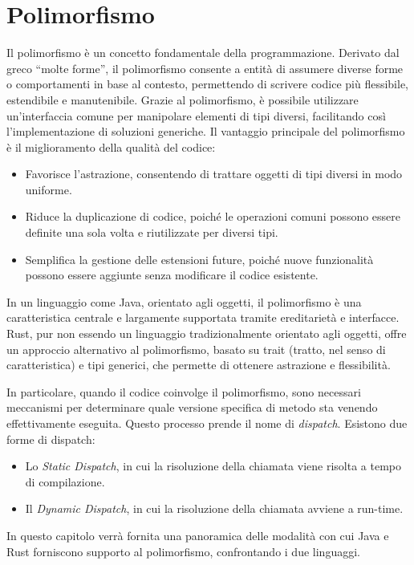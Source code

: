 
\chapter{Polimorfismo}
Il polimorfismo è un concetto fondamentale della programmazione. Derivato dal greco “molte forme”, il polimorfismo consente a entità di assumere diverse forme o comportamenti in base al contesto, permettendo di scrivere codice più flessibile, estendibile e manutenibile. Grazie al polimorfismo, è possibile utilizzare un'interfaccia comune per manipolare elementi di tipi diversi, facilitando così l'implementazione di soluzioni generiche. Il vantaggio principale del polimorfismo è il miglioramento della qualità del codice:
\begin{itemize}
    \item Favorisce l'astrazione, consentendo di trattare oggetti di tipi diversi in modo uniforme.
    \item Riduce la duplicazione di codice, poiché le operazioni comuni possono essere definite una sola volta e riutilizzate per diversi tipi.
    \item Semplifica la gestione delle estensioni future, poiché nuove funzionalità possono essere aggiunte senza modificare il codice esistente.
\end{itemize}
In un linguaggio come Java, orientato agli oggetti, il polimorfismo è una caratteristica centrale e largamente supportata tramite ereditarietà e interfacce. Rust, pur non essendo un linguaggio tradizionalmente orientato agli oggetti, offre un approccio alternativo al polimorfismo, basato su trait (tratto, nel senso di caratteristica) e tipi generici, che permette di ottenere astrazione e flessibilità.

In particolare, quando il codice coinvolge il polimorfismo, sono necessari meccanismi per determinare quale versione specifica di metodo sta venendo effettivamente eseguita. Questo processo prende il nome di \textit{dispatch}. Esistono due forme di dispatch: 
\begin{itemize}
    \item Lo \textit{Static Dispatch}, in cui la risoluzione della chiamata viene risolta a tempo di compilazione.
    \item Il \textit{Dynamic Dispatch}, in cui la risoluzione della chiamata avviene a run-time. 
\end{itemize}
In questo capitolo verrà fornita una panoramica delle modalità con cui Java e Rust forniscono supporto al polimorfismo, confrontando i due linguaggi.
